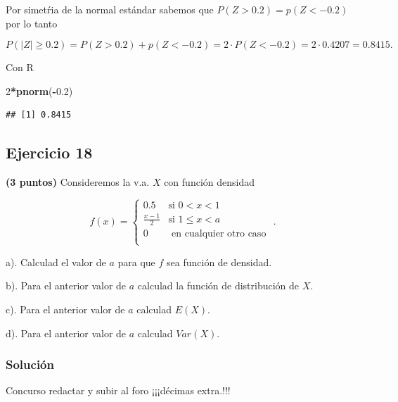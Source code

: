 \documentclass[]{article}
\newenvironment{Shaded}{\begin{snugshade}}{\end{snugshade}}
\newcommand{\DecValTok}[1]{\textcolor[rgb]{0.00,0.00,0.81}{#1}}
\newcommand{\FloatTok}[1]{\textcolor[rgb]{0.00,0.00,0.81}{#1}}
\newcommand{\KeywordTok}[1]{\textcolor[rgb]{0.13,0.29,0.53}{\textbf{#1}}}
\newcommand{\NormalTok}[1]{#1}
\newcommand{\OperatorTok}[1]{\textcolor[rgb]{0.81,0.36,0.00}{\textbf{#1}}}
\begin{document}
Por simetŕia de la normal estándar sabemos que \(P(Z>0.2)=p(Z<-0.2)\)
por lo tanto

\[P(|Z|\geq 0.2)=P(Z>0.2)+p(Z<-0.2)=2\cdot P(Z<-0.2)=2\cdot 0.4207=
0.8415.\]

Con R

\begin{Shaded}
\begin{Highlighting}[]
\DecValTok{2}\OperatorTok{*}\KeywordTok{pnorm}\NormalTok{(}\OperatorTok{-}\FloatTok{0.2}\NormalTok{)}
\end{Highlighting}
\end{Shaded}

\begin{verbatim}
## [1] 0.8415
\end{verbatim}

\hypertarget{ejercicio-18}{%
\subsection{Ejercicio 18}\label{ejercicio-18}}

\textbf{(3 puntos)} Consideremos la v.a. \(X\) con función densidad

\[f(x)=\left\{
\begin{array}{cl}
 \displaystyle 0.5& \mbox{si } 0< x <1 \\
\displaystyle\frac{x-1}{2} & \mbox{si } 1\leq x < a \\
 \displaystyle 0 & \mbox{ en cualquier otro caso } \\
\end{array}\right..
\]

a). Calculad el valor de \(a\) para que \(f\) sea función de densidad.

b). Para el anterior valor de \(a\) calculad la función de distribución
de \(X\).

c). Para el anterior valor de \(a\) calculad \(E(X)\).

d). Para el anterior valor de \(a\) calculad \(Var(X)\).

\hypertarget{soluciuxf3n-17}{%
\subsubsection{Solución}\label{soluciuxf3n-17}}

Concurso redactar y subir al foro ¡¡¡décimas extra.!!!
\end{document}
